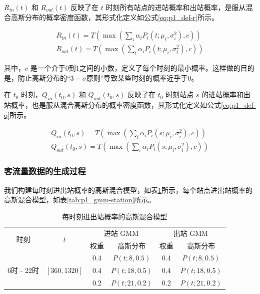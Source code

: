 \documentclass[12pt,a4paper]{mcmthesis}
\begin{document}
    $R_{in}(t)$ 和 $R_{out}(t)$ 反映了在 $t$ 时刻所有站点的进站概率和出站概率，是服从混合高斯分布的概率密度函数，其形式化定义如公式\ref{eq:p1_def-r}所示。

    \begin{equation}
        \begin{aligned}
            R_{in}(t) = T \left( \max \left( \sum_i \alpha_i P_i(t;\mu_i,\sigma^2_i), c \right) \right) \\
            R_{out}(t) = T \left( \max \left( \sum_i \alpha_i P_i(t;\mu_i,\sigma^2_i), c \right) \right)
        \end{aligned}
        \label{eq:p1_def-r}
    \end{equation}

    其中，$c$ 是一个介于0到1之间的小数，定义了每个时刻的最小概率。这样做的目的是，防止高斯分布的“$3-\sigma$原则”导致某些时刻的概率近乎于0。

    在 $t_0$ 时刻，$Q_{in}(t_0,s)$ 和 $Q_{out}(t_0,s)$ 反映了在 $t_0$ 时刻站点 $s$ 的进站概率和出站概率，也是服从混合高斯分布的概率密度函数，其形式化定义如公式\ref{eq:p1_def-q}所示。

    \begin{equation}
        \begin{aligned}
            Q_{in}(t_0,s) = T \left( \max \left( \sum_i \alpha_i P_i(s;\mu_i,\sigma^2_i), c \right) \right) \\
            Q_{out}(t_0,s) = T \left( \max \left( \sum_i \alpha_i P_i(s;\mu_i,\sigma^2_i), c \right) \right)
        \end{aligned}
        \label{eq:p1_def-q}
    \end{equation}

    \subsubsection{客流量数据的生成过程}

    我们构建每时刻进出站概率的高斯混合模型，如表\ref{tab:p1_gmm-time}所示，每个站点进出站概率的高斯混合模型，如表\ref{tab:p1_gmm-station}所示。

    \begin{table}[h]
        \centering
        \caption{每时刻进出站概率的高斯混合模型}
        \label{tab:p1_gmm-time}
        \begin{tabular}{c|c|cc|cc}
            \hline
            \multirow{2}{*}{时刻} & \multirow{2}{*}{$t$} & \multicolumn{2}{c|}{进站 GMM} & \multicolumn{2}{c}{出站 GMM} \\ \cline{3-6}
            &                         & 权重  & 高斯分布          & 权重  & 高斯分布          \\ \hline
            &                         & 0.4 & $P(t;8,0.5)$  & 0.4 & $P(t;8,0.5)$  \\
            6时 - 22时 & $\left[360,1320\right]$ & 0.4 & $P(t;18,0.5)$ & 0.4 & $P(t;18,0.5)$ \\
            &                         & 0.2 & $P(t;21,0.2)$ & 0.2 & $P(t;21,0.2)$ \\ \hline
        \end{tabular}
    \end{table}
\end{document}
